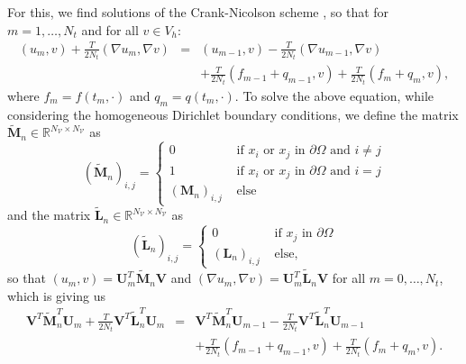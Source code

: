 For this, we find solutions of the Crank-Nicolson scheme \cite{articleMeidner}, so that for $m=1,\dotsc,N_t$ and for all $v\in V_h$:
\begin{eqnarray*}
(u_m,v) + \frac{T}{2N_t}(\nabla u_m, \nabla v) & = &(u_{m-1},v) - \frac{T}{2N_t}(\nabla u_{m-1}, \nabla v)\\
&& + \frac{T}{2N_t}(f_{m-1} + q_{m-1}, v) + \frac{T}{2N_t}(f_m + q_m, v),
\end{eqnarray*}
where $f_m=f(t_m, \cdot)$ and $q_m=q(t_m,\cdot)$. To solve the above equation, while considering the homogeneous Dirichlet boundary conditions, we define the matrix $\tilde{\mathbf{M}}_n\in\mathbb{R}^{N_\mathcal{V}\times N_\mathcal{V}}$ as
\begin{displaymath}
\left(\tilde{\mathbf{M}}_n\right)_{i,j}=\begin{cases}
0 & \text{ if $x_i$ or $x_j$ in $\partial\Omega$ and $i \neq j$}\\
1 & \text{ if $x_i$ or $x_j$ in $\partial\Omega$ and $i = j$}\\
\left(\mathbf{M}_n\right)_{i,j} & \text{ else}
\end{cases}
\end{displaymath}
and the matrix $\tilde{\mathbf{L}}_n\in\mathbb{R}^{N_\mathcal{V}\times N_\mathcal{V}}$ as
\begin{displaymath}
\left(\tilde{\mathbf{L}}_n\right)_{i,j}=\begin{cases}
0 & \text{ if $x_j$ in $\partial\Omega$}\\
\left(\mathbf{L}_n\right)_{i,j} & \text{ else,}
\end{cases}
\end{displaymath}
so that $(u_m,v)=\mathbf{U}_m^T\tilde{\mathbf{M}}_n\mathbf{V}$ and $(\nabla u_m,\nabla v)=\mathbf{U}_m^T\tilde{\mathbf{L}}_n\mathbf{V}$ for all $m=0,\dotsc,N_t$, which is giving us
\begin{eqnarray*}
\mathbf{V}^T\tilde{\mathbf{M}}_n^T\mathbf{U}_m + \frac{T}{2N_t} \mathbf{V}^T\tilde{\mathbf{L}}_n^T \mathbf{U}_m &=& \mathbf{V}^T\tilde{\mathbf{M}}_n^T\mathbf{U}_{m-1} - \frac{T}{2N_t} \mathbf{V}^T\tilde{\mathbf{L}}_n^T \mathbf{U}_{m-1}\\
&&  + \frac{T}{2N_t}(f_{m-1} + q_{m-1}, v) + \frac{T}{2N_t}(f_m + q_m, v).
\end{eqnarray*}

